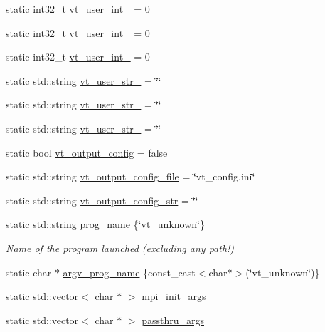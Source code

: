\begin{DoxyCompactItemize}
\item 
static int32\+\_\+t \hyperlink{structvt_1_1arguments_1_1_arg_config_a8592495c8eb82047645a9b5e0b741907}{vt\+\_\+user\+\_\+int\+\_} = 0
\item 
static int32\+\_\+t \hyperlink{structvt_1_1arguments_1_1_arg_config_ac80c25baf981f06e7f37045371a5336d}{vt\+\_\+user\+\_\+int\+\_} = 0
\item 
static int32\+\_\+t \hyperlink{structvt_1_1arguments_1_1_arg_config_a2dc50d3f0598a0a998923695f681c93a}{vt\+\_\+user\+\_\+int\+\_} = 0
\item 
static std\+::string \hyperlink{structvt_1_1arguments_1_1_arg_config_a892f7cf1b072e8fec60f5b88762f151e}{vt\+\_\+user\+\_\+str\+\_} = \char`\"{}\char`\"{}
\item 
static std\+::string \hyperlink{structvt_1_1arguments_1_1_arg_config_aaac3dd90077934c6faa99570d9b95ca1}{vt\+\_\+user\+\_\+str\+\_} = \char`\"{}\char`\"{}
\item 
static std\+::string \hyperlink{structvt_1_1arguments_1_1_arg_config_a848bd14c34337ef8d48fd740061a4923}{vt\+\_\+user\+\_\+str\+\_} = \char`\"{}\char`\"{}
\item 
static bool \hyperlink{structvt_1_1arguments_1_1_arg_config_a1c2603b198cf59894ccd323e1db4f94c}{vt\+\_\+output\+\_\+config} = false
\item 
static std\+::string \hyperlink{structvt_1_1arguments_1_1_arg_config_a4b1afc0efd172bd42ff5e644ef6a3b27}{vt\+\_\+output\+\_\+config\+\_\+file} = \char`\"{}vt\+\_\+config.\+ini\char`\"{}
\item 
static std\+::string \hyperlink{structvt_1_1arguments_1_1_arg_config_aedb86d5c79b6f43d2153c9a1fc7331ec}{vt\+\_\+output\+\_\+config\+\_\+str} = \char`\"{}\char`\"{}
\item 
static std\+::string \hyperlink{structvt_1_1arguments_1_1_arg_config_a48436d61577adf3f28fd3b3377a41b8c}{prog\+\_\+name} \{\char`\"{}vt\+\_\+unknown\char`\"{}\}
\begin{DoxyCompactList}\small\item\em Name of the program launched (excluding any path!) \end{DoxyCompactList}\item 
static char $\ast$ \hyperlink{structvt_1_1arguments_1_1_arg_config_aae77bdfe755eeaf6ea8d2f00dffc6077}{argv\+\_\+prog\+\_\+name} \{const\+\_\+cast$<$char$\ast$$>$(\char`\"{}vt\+\_\+unknown\char`\"{})\}
\item 
static std\+::vector$<$ char $\ast$ $>$ \hyperlink{structvt_1_1arguments_1_1_arg_config_a742020618b402b1eeafb9898d34978d7}{mpi\+\_\+init\+\_\+args}
\item 
static std\+::vector$<$ char $\ast$ $>$ \hyperlink{structvt_1_1arguments_1_1_arg_config_a730c6c732bc622c6d1d29961380f5c72}{passthru\+\_\+args}
\end{DoxyCompactItemize}
